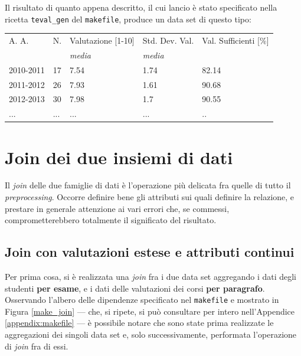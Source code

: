 		Il risultato di quanto appena descritto, il cui lancio è stato specificato nella ricetta \texttt{teval\_gen} del \texttt{makefile}, produce un data set di questo tipo:\\

		\begin{tabular}{lllll}
		\hline
		A. A. & N. & Valutazione [1-10] & Std. Dev. Val. & Val. Sufficienti {[}\%{]} \\
		& & \textit{media} & \textit{media} & \\
		\hline
		2010-2011 & 17 & 7.54 & 1.74 & 82.14  \\
		2011-2012 & 26 & 7.93 & 1.61 & 90.68 \\
		2012-2013 & 30 & 7.98 & 1.7 & 90.55 \\
		... & ... & ... & ... & .. \\ \hline
		\end{tabular}

		\vspace{0.3cm}

\section{Join dei due insiemi di dati}

	Il \textit{join} delle due famiglie di dati è l'operazione più delicata fra quelle di tutto il \textit{preprocessing}. Occorre definire bene gli attributi sui quali definire la relazione, e prestare in generale attenzione ai vari errori che, se commessi, comprometterebbero totalmente il significato del risultato. \\

	\subsection{Join con valutazioni estese e attributi continui}

		Per prima cosa, si è realizzata una \textit{join} fra i due data set aggregando i dati degli studenti \textbf{per esame}, e i dati delle valutazioni dei corsi \textbf{per paragrafo}. Osservando l'albero delle dipendenze specificato nel \texttt{makefile} e mostrato in Figura \ref{make_join} --- che, si ripete, si può consultare per intero nell'Appendice \ref{appendix:makefile} --- è possibile notare che sono state prima realizzate le aggregazioni dei singoli data set e, solo successivamente, performata l'operazione di \textit{join} fra di essi. \\

